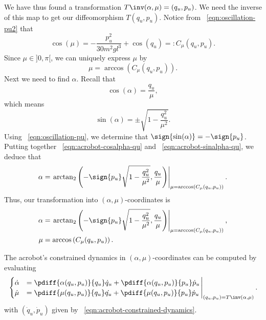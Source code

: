 We have thus found a transformation \(T\inv(\alpha,\mu) = (q_u,p_u)\).
We need the inverse of this map to get our diffeomorphism \(T(q_u,p_u)\).
Notice from ~\eqref{eqn:oscillation-pu2} that
\[
    \cos(\mu) = -\frac{p_u^2}{30m^2gl^3} + \cos(q_u) =: C_\mu(q_u,p_u)
    .
\]
Since \(\mu \in ]0,\pi[\), we can uniquely express \(\mu\) by
\begin{equation*}
    \mu = \arccos\left(C_\mu(q_u,p_u)\right)
    .
\end{equation*}
Next we need to find \(\alpha\). 
Recall that 
\begin{equation}\label{eqn:acrobot-cosalpha-qu}
    \cos(\alpha) = \frac{q_u}{\mu}
    ,
\end{equation}
which means 
\begin{equation}\label{eqn:acrobot-sinalpha-qu}
    \sin(\alpha) = \pm \sqrt{1 - \frac{q_u^2}{\mu^2}}
    .
\end{equation}
Using ~\eqref{eqn:oscillation-pu}, we determine that
\(\sign{\sin(\alpha)} = -\sign{p_u}\).
Putting together ~\eqref{eqn:acrobot-cosalpha-qu} and
~\eqref{eqn:acrobot-sinalpha-qu}, we deduce that
\begin{equation*}
    \alpha = \left.
        \arctan_2\left( -\sign{p_u}\sqrt{1 - \frac{q_u^2}{\mu^2}}, \frac{q_u}{\mu}\right)
        \right|_{\mu = \arccos(C_\mu(q_u,p_u))}
    .
\end{equation*}
Thus, our transformation into \((\alpha,\mu)\)-coordinates is
\begin{align}
        \label{eqn:alpha-qupu}
        \alpha &= \left.
        \arctan_2\left( -\sign{p_u}\sqrt{1 - \frac{q_u^2}{\mu^2}}, \frac{q_u}{\mu}\right)
        \right|_{\mu = \arccos(C_\mu(q_u,p_u))}
        ,\\
        \label{eqn:mu-qupu}
        \mu &= \arccos\left(C_\mu(q_u,p_u)\right)
        .
\end{align}

The acrobot's constrained dynamics in
\((\alpha,\mu)\)-coordinates can be computed by evaluating
\begin{equation*}
\left.\begin{cases}
    \dot{\alpha} &= \pdiff{\alpha(q_u,p_u)}{q_u}\dot{q}_u + 
        \pdiff{\alpha(q_u,p_u)}{p_u}\dot{p}_u
    \\
    \dot{\mu} &= \pdiff{\mu(q_u,p_u)}{q_u}\dot{q_u} +
         \pdiff{\mu(q_u,p_u)}{p_u}\dot{p}_u
    \end{cases}\right|_{(q_u,p_u) = T\inv(\alpha,\mu)}
    .
\end{equation*}
with \((\dot{q}_u,\dot{p}_u)\) given by 
 ~\eqref{eqn:acrobot-constrained-dynamics}.

